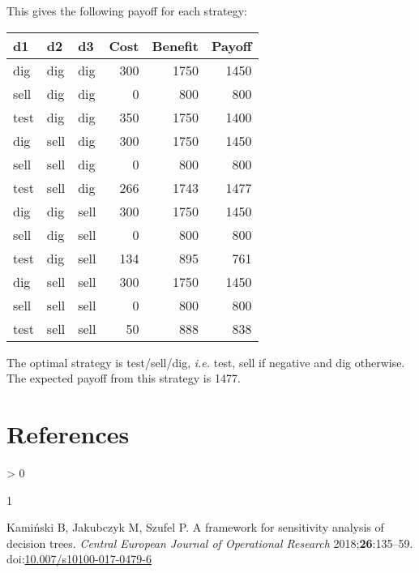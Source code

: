 \documentclass[
]{article}
\newenvironment{Shaded}{\begin{snugshade}}{\end{snugshade}}
\newcommand{\CommentTok}[1]{\textcolor[rgb]{0.56,0.35,0.01}{\textit{#1}}}
\newcommand{\FunctionTok}[1]{\textcolor[rgb]{0.00,0.00,0.00}{#1}}
\newcommand{\NormalTok}[1]{#1}
\newcommand{\OtherTok}[1]{\textcolor[rgb]{0.56,0.35,0.01}{#1}}
\newcommand{\SpecialCharTok}[1]{\textcolor[rgb]{0.00,0.00,0.00}{#1}}
\newlength{\cslhangindent}
\newlength{\csllabelwidth}
\newenvironment{CSLReferences}[2] %
 {%
  \setlength{\parindent}{0pt}
  \ifodd #1 \everypar{\setlength{\hangindent}{\cslhangindent}}\ignorespaces\fi
  \ifnum #2 > 0
  \setlength{\parskip}{#2\baselineskip}
  \fi
 }%
 {}
\newcommand{\CSLLeftMargin}[1]{\parbox[t]{\csllabelwidth}{#1}}
\newcommand{\CSLRightInline}[1]{\parbox[t]{\linewidth - \csllabelwidth}{#1}\break}
\begin{document}
\begin{Shaded}
\end{Shaded}

This gives the following payoff for each strategy:

\begin{longtable}[]{@{}lllrrr@{}}
\toprule
d1 & d2 & d3 & Cost & Benefit & Payoff\tabularnewline
\midrule
\endhead
dig & dig & dig & 300 & 1750 & 1450\tabularnewline
sell & dig & dig & 0 & 800 & 800\tabularnewline
test & dig & dig & 350 & 1750 & 1400\tabularnewline
dig & sell & dig & 300 & 1750 & 1450\tabularnewline
sell & sell & dig & 0 & 800 & 800\tabularnewline
test & sell & dig & 266 & 1743 & 1477\tabularnewline
dig & dig & sell & 300 & 1750 & 1450\tabularnewline
sell & dig & sell & 0 & 800 & 800\tabularnewline
test & dig & sell & 134 & 895 & 761\tabularnewline
dig & sell & sell & 300 & 1750 & 1450\tabularnewline
sell & sell & sell & 0 & 800 & 800\tabularnewline
test & sell & sell & 50 & 888 & 838\tabularnewline
\bottomrule
\end{longtable}

The optimal strategy is test/sell/dig, \emph{i.e.} test, sell if
negative and dig otherwise. The expected payoff from this strategy is
1477.

\hypertarget{references}{%
\section*{References}\label{references}}

\hypertarget{refs}{}
\begin{CSLReferences}{0}{0}
\leavevmode\hypertarget{ref-kaminski2018}{}%
\CSLLeftMargin{1 }
\CSLRightInline{Kamiński B, Jakubczyk M, Szufel P. A framework for
sensitivity analysis of decision trees. \emph{Central European Journal
of Operational Research} 2018;\textbf{26}:135--59.
doi:\href{https://doi.org/10.007/s10100-017-0479-6}{10.007/s10100-017-0479-6}}

\end{CSLReferences}
\end{document}

